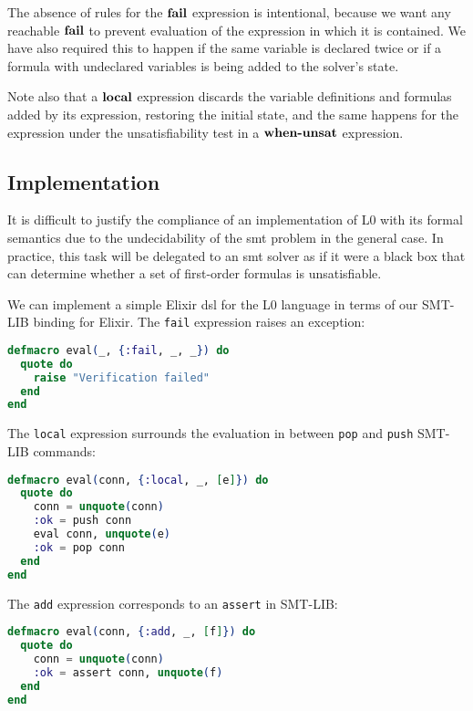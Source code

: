 The absence of rules for the $\textbf{fail}$ expression is intentional, because we want
any reachable $\textbf{fail}$ to prevent evaluation of the expression in which it is
contained.  We have also required this to happen if the same variable is
declared twice or if a formula with undeclared variables is being added to the 
solver's state.

Note also that a $\textbf{local}$ expression discards the variable definitions and
formulas added by its expression, restoring the initial state, and the same
happens for the expression under the unsatisfiability test in a $\textbf{when-unsat}$
expression.

\subsection{Implementation}
\label{integ:l0implementation}

It is difficult to justify the compliance of an implementation of L0 with its
formal semantics due to the undecidability of the \gls{smt} problem in the 
general case. In practice, this task will be delegated to an \acrshort{smt} 
solver as if it were a black box that can determine whether a set of first-order
formulas is unsatisfiable.

We can implement a simple Elixir \gls{dsl} for the L0 language in terms of our
SMT-LIB binding for Elixir. The \verb|fail| expression raises an exception:

\begin{lstlisting}[language=elixir,numbers=none,frame=none]
defmacro eval(_, {:fail, _, _}) do
  quote do
    raise "Verification failed"
  end
end
\end{lstlisting}

The \verb|local| expression surrounds the evaluation in between \verb|pop| and
\verb|push| SMT-LIB commands:

\begin{lstlisting}[language=elixir,numbers=none,frame=none]
defmacro eval(conn, {:local, _, [e]}) do
  quote do
    conn = unquote(conn)
    :ok = push conn
    eval conn, unquote(e)
    :ok = pop conn
  end
end
\end{lstlisting}

The \verb|add| expression corresponds to an \verb|assert| in SMT-LIB:

\begin{lstlisting}[language=elixir,numbers=none,frame=none]
defmacro eval(conn, {:add, _, [f]}) do
  quote do
    conn = unquote(conn)
    :ok = assert conn, unquote(f)
  end
end
\end{lstlisting}

